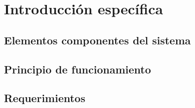 \chapter{Introducción específica} %

\label{Chapter2}



\section{Elementos componentes del sistema}
\label{sec:elementos_componentes_sistema}

\section{Principio de funcionamiento}
\label{sec:principio_funcionamiento}

\section{Requerimientos}
\label{sec:requerimientos}

